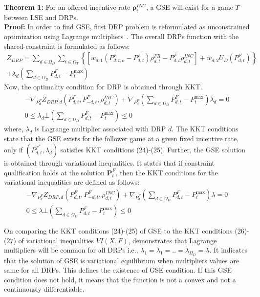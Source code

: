 \documentclass[journal]{IEEEtran}
\begin{document}
\textbf{Theorem 1:} For an offered incentive rate $\boldsymbol{\rho} _t^{INC}$, a GSE will exist for a game $\Upsilon $ between LSE and DRPs.\\
\textbf{Proof:} In order to find GSE, first DRP problem is reformulated as unconstrained optimization using Lagrange multipliers~\cite{bertsekas2014constrained}. The overall DRPs function with the shared-constraint is formulated as follows:
\begin{equation}
\begin{gathered}
	{Z_{DRP}} = \sum\limits_{d \in {\Omega _D}} {\sum\limits_{t \in {\Omega _T}} {\left\{ {[w_{d,1}(P_{d,t,o}^F - P_{d,t}^F)\rho _{d,t}^{FR} - P_{d,t}^F\rho _{d,t}^{INC}] + w_{d,2}{U_D}(P_{d,t}^F)} \right\}} } \\
	+ {\lambda _d}\left( {\sum\limits_{d \in {\Omega _D}} {P_{d,t}^F}  - P_{t}^{\max }} \right)
\end{gathered}
\end{equation}
Now, the optimality condition for DRP  is obtained through KKT.
\begin{gather}
 - {\nabla _{P_d^F}}{Z_{DRP,d}}(P_{d,t}^F,P_{ - d,t}^F,\rho _{d,t}^{INC}) + {\nabla _{P_d^F}}\left( {\sum\limits_{d \in {\Omega _D}} {P_{d,t}^F}  - P_{t}^{\max }} \right){\lambda _d} = 0\\
0 \le {\lambda _d} \bot \left( {\sum\limits_{d \in {\Omega _D}} {P_{d,t}^F}  - P_{t}^{\max }} \right) \le 0
\end{gather}
where, ${\lambda _d}$ is Lagrange multiplier associated with DRP $d$. The KKT conditions state that the GSE exists for the follower game at a given fixed incentive rate, only if $(P_{d,t}^{F^{*}},{\lambda _d})$ satisfies KKT conditions (24)-(25). Further, the GSE solution is obtained through variational inequalities. It states that if constraint qualification holds at the solution $\boldsymbol{P}_t^F$, then the KKT conditions for the variational inequalities are defined as follows\mbox{\cite{facchinei2007generalized}}:
\begin{gather}
		- {\nabla _{P_d^F}}{Z_{DRP,d}}(P_{d,t}^F,P_{ - d,t}^F,\rho _{d,t}^{INC}) + {\nabla _{P_d^F}}\left( {\sum\limits_{d \in {\Omega _D}} {P_{d,t}^F}  - P_t^{\max }} \right)\lambda  = 0\\
		0 \le \lambda  \bot \left( {\sum\limits_{d \in {\Omega _D}} {P_{d,t}^F}  - P_t^{\max }} \right) \le 0
\end{gather} 

On comparing the KKT conditions (24)-(25) of GSE to the KKT conditions (26)-(27) of variational inequalities $VI(X,F)$, demonstrates that Lagrange multipliers will be common for all DRPs i.e., \mbox{${\lambda _1} = {\lambda _1} = .. = {\lambda _{{\Omega _D}}} = \lambda $}. It indicates that the solution of GSE is variational equilibrium when multipliers values are same for all DRPs\mbox{\cite{facchinei2007generalized,tushar2012economics,li2018interactive}}. This defines the existence of GSE condition. If this GSE condition does not hold, it means that the function is not a convex and not a continuously differentiable\mbox{\cite{facchinei2007generalized}}.
\end{document}
